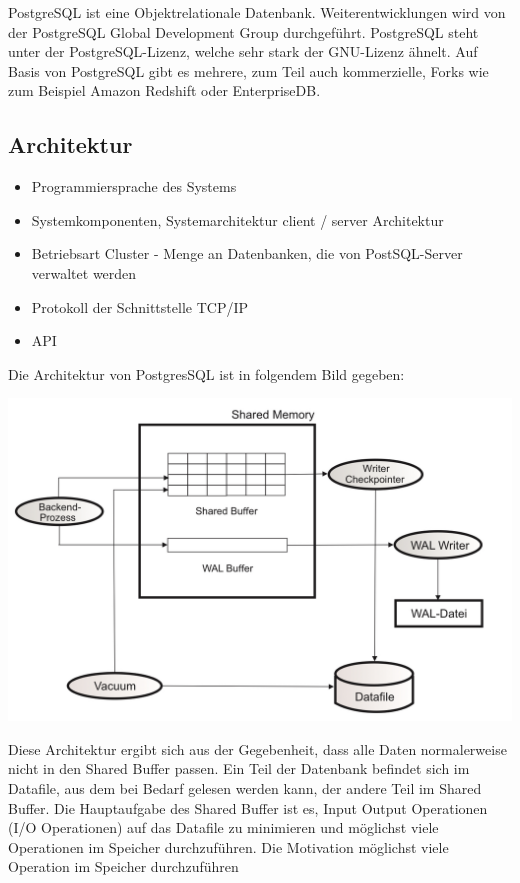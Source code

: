 \newpage
PostgreSQL ist eine Objektrelationale Datenbank. Weiterentwicklungen wird von der PostgreSQL Global Development Group durchgeführt. PostgreSQL steht unter der PostgreSQL-Lizenz, welche sehr stark der GNU-Lizenz ähnelt. Auf Basis von PostgreSQL gibt es mehrere, zum Teil auch kommerzielle, Forks wie zum Beispiel Amazon Redshift oder EnterpriseDB.
\subsection{Architektur}
    \begin{itemize}
        \item Programmiersprache des Systems
        \item Systemkomponenten, Systemarchitektur
        \subitem client / server Architektur
        \item Betriebsart
            \subitem Cluster - Menge an Datenbanken, die von PostSQL-Server verwaltet werden \cite{froehlich01}
        \item Protokoll der Schnittstelle
        \subitem TCP/IP
        \item API
    \end{itemize}
    Die Architektur von PostgresSQL ist in folgendem Bild gegeben:
    \begin{center}
        \includegraphics[width = \linewidth]{./images/PostgresSQLArchitektur.jpg}
    \end{center}
    Diese Architektur ergibt sich aus der Gegebenheit, dass alle Daten normalerweise nicht in den Shared Buffer passen. Ein Teil der Datenbank befindet sich im Datafile, aus dem bei Bedarf gelesen werden kann, der andere Teil im Shared Buffer.
    Die Hauptaufgabe des Shared Buffer ist es, Input Output Operationen (I/O Operationen) auf das Datafile zu minimieren und möglichst viele Operationen im Speicher durchzuführen. Die Motivation möglichst viele Operation im Speicher durchzuführen
